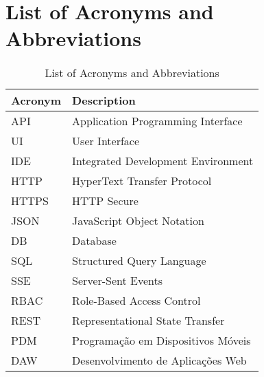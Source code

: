 \section*{List of Acronyms and Abbreviations}
\begin{table}[H]
\centering
\begin{tabular}{ll}
\textbf{Acronym} & \textbf{Description} \\
\hline
API  & Application Programming Interface \\
UI   & User Interface \\
IDE  & Integrated Development Environment \\
HTTP & HyperText Transfer Protocol \\
HTTPS & HTTP Secure \\
JSON & JavaScript Object Notation \\
DB   & Database \\
SQL  & Structured Query Language \\
SSE  & Server-Sent Events \\
RBAC & Role-Based Access Control \\
REST & Representational State Transfer \\
PDM & Programação em Dispositivos Móveis \\
DAW & Desenvolvimento de Aplicações Web
\end{tabular}
\caption{List of Acronyms and Abbreviations}
\end{table}
